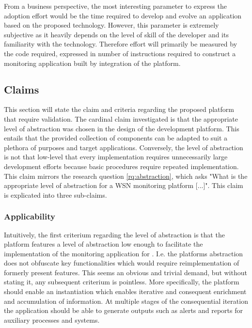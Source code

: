 From a business perspective, the most interesting parameter to express the adoption effort would be the time required to develop and evolve an application based on the proposed technology. However, this parameter is extremely subjective as it heavily depends on the level of skill of the developer and its familiarity with the technology. Therefore effort will primarily be measured by the code required, expressed in number of instructions required to construct a monitoring application built by integration of the platform. 

\subsection{Claims}
\label{sec:claims}
This section will state the claim and criteria regarding the proposed platform that require validation. The cardinal claim investigated is that the appropriate level of abstraction was chosen in the design of the development platform. This entails that the provided collection of components can be adapted to suit a plethora of purposes and target applications. Conversely, the level of abstraction is not that low-level that every implementation requires unnecessarily large development efforts because basic procedures require repeated implementation. This claim mirrors the research question \ref{rq:abstraction}, which asks "What is the appropriate level of abstraction for a WSN monitoring platform [...]". This claim is explicated into three sub-claims.

\subsubsection{Applicability}
Intuitively, the first criterium regarding the level of abstraction is that the platform features a level of abstraction low enough to facilitate the implementation of the monitoring application for \sensit. I.e. the platforms abstraction does not obfuscate key functionalities which would require reimplementation of formerly present features. This seems an obvious and trivial demand, but without stating it, any subsequent criterium is pointless. More specifically, the platform should enable an instantiation which enables iterative and consequent enrichment and accumulation of information. At multiple stages of the consequential iteration the application should be able to generate outputs such as alerts and reports for auxiliary processes and systems.

